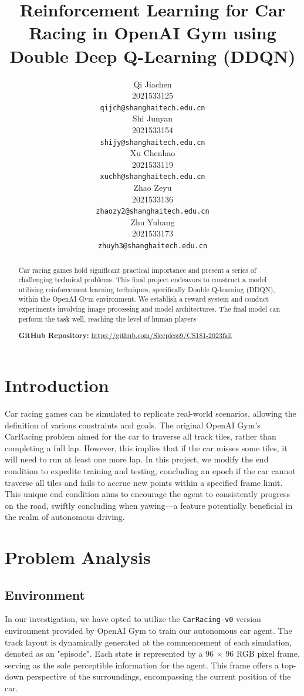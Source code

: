 \documentclass{article}
\title{Reinforcement Learning for Car Racing in OpenAI Gym using Double Deep Q-Learning (DDQN)}
\author{%
  Qi Jiachen \\
  2021533125 \\
  \texttt{qijch@shanghaitech.edu.cn} \\
  \And
  Shi Junyan \\
  2021533154 \\
  \texttt{shijy@shanghaitech.edu.cn} \\
  \AND
  Xu Chenhao \\
  2021533119 \\
  \texttt{xuchh@shanghaitech.edu.cn} \\
  \And
  Zhao Zeyu \\
  2021533136 \\
  \texttt{zhaozy2@shanghaitech.edu.cn} \\
  \And
  Zhu Yuhang \\
  2021533173 \\
  \texttt{zhuyh3@shanghaitech.edu.cn} \\
}
\begin{document}
\maketitle


\begin{abstract}
Car racing games hold significant practical importance and present a series of 
challenging technical problems. This final project endeavors to construct a 
model utilizing reinforcement learning techniques, specifically Double Q-learning 
(DDQN), within the OpenAI Gym environment. We establish a reward system and conduct 
experiments involving image processing and model architectures. The final model 
can perform the task well, reaching the level of human players

\textbf{GitHub Repository:} \url{https://github.com/Sleepless9/CS181-2023fall}
\end{abstract}

\section{Introduction}

Car racing games can be simulated to replicate real-world 
scenarios, allowing the definition of various constraints and goals. The original 
OpenAI Gym's CarRacing problem aimed for the car to traverse all track tiles, rather than 
completing a full lap. However, this implies that if the car misses some tiles, 
it will need to run at least one more lap. In this project, we modify the end 
condition to expedite training and testing, concluding an epoch if the car 
cannot traverse all tiles and fails to accrue new points within a specified 
frame limit. This unique end condition aims to encourage the agent to consistently 
progress on the road, swiftly concluding when yawing—a feature potentially beneficial 
in the realm of autonomous driving.


\section{Problem Analysis}
\subsection{Environment}
In our investigation, we have opted to utilize the \texttt{CarRacing-v0} version environment provided by OpenAI Gym to train our autonomous car agent. The track layout is dynamically generated at the commencement of each simulation, denoted as an "episode". Each state is represented by a 96 $\times$ 96 RGB pixel frame, serving as the sole perceptible information for the agent. This frame offers a top-down perspective of the surroundings, encompassing the current position of the car.
\end{document}
